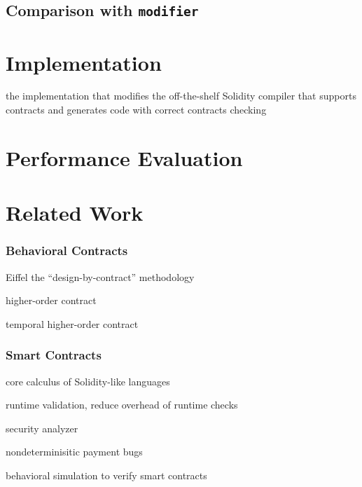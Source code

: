 \documentclass[acmsmall,review,anonymous]{acmart}\settopmatter{printfolios=true,printccs=false,printacmref=false}
\begin{document}
\subsection{Comparison with \texttt{modifier}}


\section{Implementation}

the implementation that modifies the off-the-shelf Solidity compiler that
supports contracts and generates code with correct contracts checking

\section{Performance Evaluation}

\section{Related Work}

\subsubsection*{\textbf{Behavioral Contracts}}

Eiffel the ``design-by-contract'' methodology \cite{DBLP:books/ph/Meyer91, DBLP:conf/tools/Meyer98a}

higher-order contract \cite{DBLP:conf/icfp/FindlerF02}

temporal higher-order contract \cite{DBLP:conf/icfp/DisneyFM11}

\subsubsection*{\textbf{Smart Contracts}}

core calculus of Solidity-like languages \cite{Sergey2021, DBLP:conf/esorics/BartolettiGM19, DBLP:conf/fc/CrafaPZ19}

runtime validation, reduce overhead of runtime checks \cite{DBLP:conf/pldi/LiCL20}

security analyzer \cite{DBLP:conf/pldi/BrentGLSS20}

nondeterminisitic payment bugs \cite{DBLP:journals/pacmpl/WangZS19}

behavioral simulation to verify smart contracts \cite{DBLP:conf/pldi/BeillahiCEE20}
\end{document}
